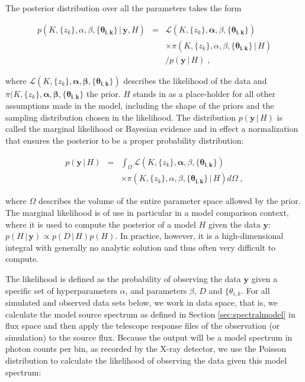 \documentclass[12pt]{emulateapj}
\newcommand{\given}{\,|\,}
\newcommand{\counts}{y}
\newcommand{\pars}{\theta}
\newcommand{\likelihood}{{\mathcal L}}
\begin{document}
The posterior distribution over all the parameters takes the form

\begin{eqnarray}
p(K, \{z_k\}, \alpha, \beta, \{\bm{\pars_{i,k}}\} \given  \bm{\counts}, H) & = & \likelihood(K, \{z_k\}, \bm{\alpha}, \beta, \{\bm{\pars_{i,k}}\}) \\\nonumber
					& & \times \pi(K, \{z_k\}, \alpha, \beta, \{\bm{\pars_{i,k}}\} \given H) \\\nonumber
					& &  / p(\bm{\counts} \given H)\; ,
\end{eqnarray} 

\noindent where $\likelihood(K, \{z_k\}, \bm{\alpha}, \bm{\beta}, \{\bm{\pars_{i,k}}\})$ describes the likelihood of the data and $\pi(K, \{z_k\}, \bm{\alpha}, \bm{\beta}, \{\bm{\pars_{i,k}}\} $ the prior. $H$ stands in as a place-holder for all other assumptions made in the model, including the shape of the priors and the sampling distribution chosen in the likelihood. The distribution $p(\bm{\counts} \given H)$ is called the marginal likelihood or Bayesian evidence and in effect a normalization that ensures the posterior to be a proper probability distribution:

\begin{eqnarray}
p(\bm{\counts} \given H) & = & \int_\Omega{ \likelihood(K, \{z_k\}, \bm{\alpha}, \beta, \{\bm{\pars_{i,k}}\}) } \\\nonumber
					& &{ \times \pi(K, \{z_k\}, \alpha, \beta, \{\bm{\pars_{i,k}}\} \given H) d\Omega} \; ,
\end{eqnarray}

\noindent where $\Omega$ describes the volume of the entire parameter space allowed by the prior. The marginal likelihood is of use in particular in a model comparison context, where it is used to compute the posterior of a model $H$ given the data $\bm{\counts}$: $p(H \given \bm{\counts}) \propto p(D \given H) p(H)$. In practice, however, it is a high-dimensional integral with generally no analytic solution and thus often very difficult to compute.

The likelihood is defined as the probability of observing the data $\bm{\counts}$ given a specific set of hyperparameters $\alpha$, and parameters $\beta$, $D$ and $\{\pars_{i,k}$. For all simulated and observed data sets below, we work in data space, that is, we calculate the model source spectrum as defined in Section \ref{sec:spectralmodel} in flux space and then apply the telescope response files of the observation (or simulation) to the source flux. Because the output will be a model spectrum in photon counts per bin, as recorded by the X-ray detector, we use the Poisson distribution to calculate the likelihood of observing the data given this model spectrum:
\end{document}
